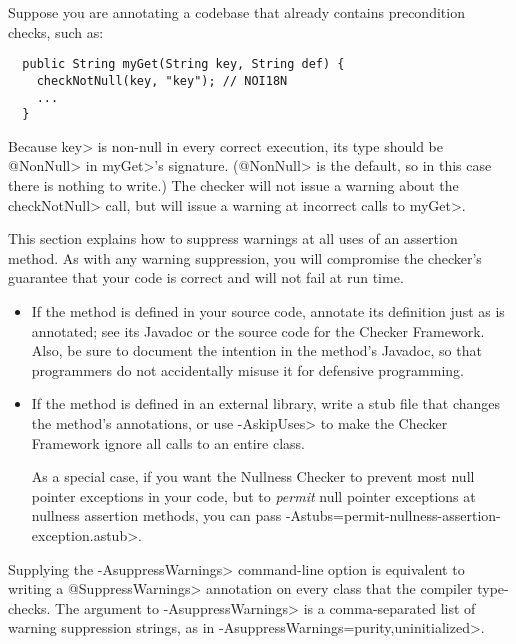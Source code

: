 Suppose you are annotating a codebase that already contains precondition checks,
such as:

\begin{Verbatim}
  public String myGet(String key, String def) {
    checkNotNull(key, "key"); // NOI18N
    ...
  }
\end{Verbatim}

\noindent
Because \<key> is non-null in every correct execution, its type should be
\<@NonNull> in \<myGet>'s signature.  (\<@NonNull> is the default, so in
this case there is nothing to write.)  The checker will not issue a warning
about the \<checkNotNull> call, but will issue a warning at incorrect calls
to \<myGet>.


This section explains how to suppress warnings at all uses of an assertion
method.  As with any warning suppression, you will compromise the checker's
guarantee that your code is correct and will not fail at run time.

\begin{itemize}
\item
  If the method is defined in your source code, annotate its definition just as
   is
  annotated; see its Javadoc or the source code for the Checker Framework.
  Also, be sure to document the intention in the method's Javadoc, so that
  programmers do not
  accidentally misuse it for defensive programming.
\item
  If the method is defined in an external library, write a stub file that
  changes the method's annotations, or use \<-AskipUses> to make the
  Checker Framework ignore all calls to an entire class.

  As a special case, if you want the Nullness Checker to prevent most null
  pointer exceptions in your code, but to \emph{permit} null pointer
  exceptions at nullness assertion methods, you can pass
  \<-Astubs=permit-nullness-assertion-exception.astub>.
\end{itemize}



Supplying the \<-AsuppressWarnings> command-line option is equivalent to
writing a \<@SuppressWarnings> annotation on every class that the compiler
type-checks.  The argument to \<-AsuppressWarnings> is a comma-separated
list of warning suppression strings, as in
\<-AsuppressWarnings=purity,uninitialized>.

